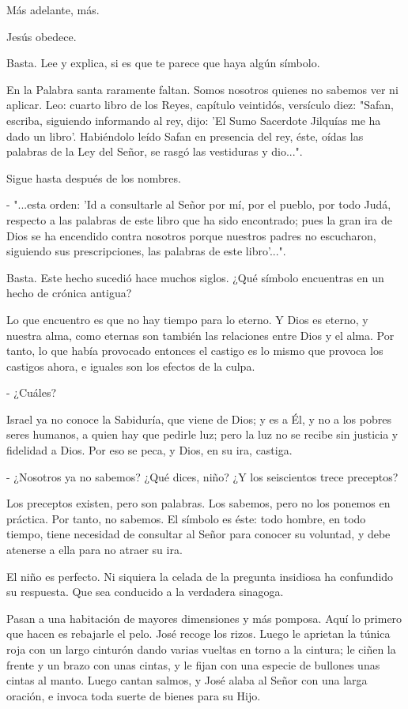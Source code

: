 \documentclass[12pt, twoside, openright]{book} %
\begin{document}
Más adelante, más. 

Jesús obedece. 

Basta. Lee y explica, si es que te parece que haya algún símbolo. 

En la Palabra santa raramente faltan. Somos nosotros quienes no sabemos ver ni aplicar. Leo: cuarto libro de los Reyes, capítulo veintidós, versículo diez: "Safan, escriba, siguiendo informando al rey, dijo: 'El Sumo Sacerdote Jilquías me ha dado un libro'. Habiéndolo leído Safan en presencia del rey, éste, oídas las palabras de la Ley del Señor, se rasgó las vestiduras y dio...". 

Sigue hasta después de los nombres. 

- "...esta orden: 'Id a consultarle al Señor por mí, por el pueblo, por todo Judá, respecto a las palabras de este libro que ha sido encontrado; pues la gran ira de Dios se ha encendido contra nosotros porque nuestros padres no escucharon, siguiendo sus prescripciones, las palabras de este libro'...". 

Basta. Este hecho sucedió hace muchos siglos. ¿Qué símbolo encuentras en un hecho de crónica antigua? 

Lo que encuentro es que no hay tiempo para lo eterno. Y Dios es eterno, y nuestra alma, como eternas son también las relaciones entre Dios y el alma. Por tanto, lo que había provocado entonces el castigo es lo mismo que provoca los castigos ahora, e iguales son los efectos de la culpa. 

- ¿Cuáles? 

Israel ya no conoce la Sabiduría, que viene de Dios; y es a Él, y no a los pobres seres humanos, a quien hay que pedirle luz; pero la luz no se recibe sin justicia y fidelidad a Dios. Por eso se peca, y Dios, en su ira, castiga. 

- ¿Nosotros ya no sabemos? ¿Qué dices, niño? ¿Y los seiscientos trece preceptos? 

Los preceptos existen, pero son palabras. Los sabemos, pero no los ponemos en práctica. Por tanto, no sabemos. El símbolo es éste: todo hombre, en todo tiempo, tiene necesidad de consultar al Señor para conocer su voluntad, y debe atenerse a ella para no atraer su ira. 

El niño es perfecto. Ni siquiera la celada de la pregunta insidiosa ha confundido su respuesta. Que sea conducido a la verdadera sinagoga. 

Pasan a una habitación de mayores dimensiones y más pomposa. Aquí lo primero que hacen es rebajarle el pelo. José recoge los rizos. Luego le aprietan la túnica roja con un largo cinturón dando varias vueltas en torno a la cintura; le ciñen la frente y un brazo con unas cintas, y le fijan con una especie de bullones unas cintas al manto. Luego cantan salmos, y José alaba al Señor con una larga oración, e invoca toda suerte de bienes para su Hijo. 
\end{document}
